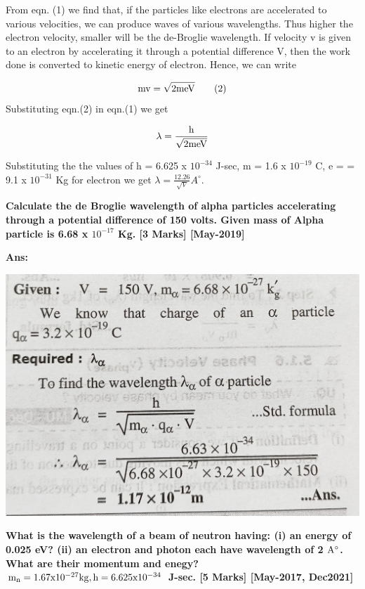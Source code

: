 \documentclass{exam}
\begin{document}
\begin{questions}
From eqn. (1) we find that, if the particles like electrons are accelerated to various velocities, we can produce waves of various wavelengths. Thus higher the electron velocity, smaller will be the de-Broglie wavelength. If velocity v is given to an electron by accelerating it through a potential difference V, then the work done is converted to kinetic energy of electron. Hence, we can write 

\begin{equation*}
\rm mv = \sqrt{2meV} \qquad (2)
\end{equation*}
Substituting eqn.(2) in eqn.(1) we get

\begin{equation*}
\rm \lambda = \frac{h}{\sqrt{2meV}} 
\end{equation*}

Substituting the the values of h = 6.625 x $10^{-34}$ J-sec, m = 1.6 x $10^{-19}$ C, e = = 9.1 x $10^{-31}$ Kg for electron we get $\lambda = \frac{12.26}{\sqrt{V}}  A^{\circ}$.

\question \textbf{ Calculate the de Broglie wavelength of alpha particles accelerating through a potential difference of 150 volts. Given mass of Alpha particle is 6.68 x $10^{-17}$ Kg. \hfil [3 Marks] [May-2019]}

\textbf{Ans:}
\begin{center}
\includegraphics[scale=0.23]{Q3.jpeg}
\end{center}

\question \textbf{ What is the wavelength of a beam of neutron having: (i) an energy of 0.025 eV? (ii) an electron and photon each have wavelength of 2 $\rm A^{\circ}$. What are their momentum and enegy? $\rm m_{n} = 1.67 x 10^{-27} kg, h = 6.625 x 10^{-34}$ J-sec. \hfil  [5 Marks] [May-2017, Dec2021] }


\end{questions}
\end{document}
